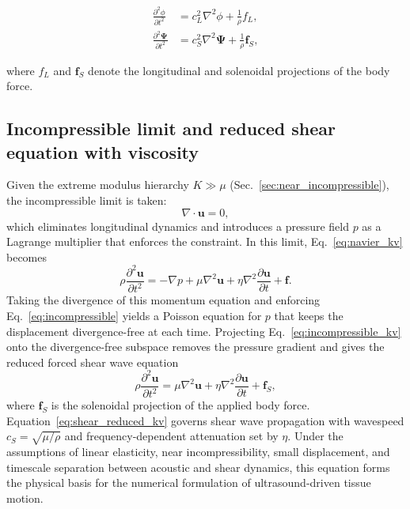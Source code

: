 \documentclass[11pt]{article}
\begin{document}
\begin{align}
\frac{\partial^2 \phi}{\partial t^2} &= c_L^2 \nabla^2 \phi + \frac{1}{\rho} f_L,
\\
\frac{\partial^2 \mathbf{\Psi}}{\partial t^2} &= c_S^2 \nabla^2 \mathbf{\Psi} + \frac{1}{\rho} \mathbf{f}_S,
\end{align}

where $f_L$ and $\mathbf{f}_S$ denote the longitudinal and solenoidal
projections of the body force.

\subsection{Incompressible limit and reduced shear equation with viscosity}
\label{sec:incompressible_limit}

Given the extreme modulus hierarchy $K \gg \mu$ (Sec.~\ref{sec:near_incompressible}),
the incompressible limit is taken:
\begin{equation}
\nabla \cdot \mathbf{u} = 0,
\label{eq:incompressible}
\end{equation}
which eliminates longitudinal dynamics and introduces a pressure field $p$
as a Lagrange multiplier that enforces the constraint. In this limit,
Eq.~\eqref{eq:navier_kv} becomes
\begin{equation}
\rho \frac{\partial^2 \mathbf{u}}{\partial t^2}
=
-\nabla p + \mu \nabla^2 \mathbf{u}
+ \eta \nabla^2 \frac{\partial \mathbf{u}}{\partial t}
+ \mathbf{f}.
\label{eq:incompressible_kv}
\end{equation}
Taking the divergence of this momentum equation and enforcing
Eq.~\eqref{eq:incompressible} yields a Poisson equation for $p$ that
keeps the displacement divergence-free at each time. Projecting
Eq.~\eqref{eq:incompressible_kv} onto the divergence-free subspace removes
the pressure gradient and gives the reduced forced shear wave equation
\begin{equation}
\rho \frac{\partial^2 \mathbf{u}}{\partial t^2}
=
\mu \nabla^2 \mathbf{u}
+ \eta \nabla^2 \frac{\partial \mathbf{u}}{\partial t}
+ \mathbf{f}_S,
\label{eq:shear_reduced_kv}
\end{equation}
where $\mathbf{f}_S$ is the solenoidal projection of the applied body force.
Equation~\eqref{eq:shear_reduced_kv} governs shear wave propagation with
wavespeed $c_S = \sqrt{\mu/\rho}$ and frequency-dependent attenuation set by $\eta$.
Under the assumptions of linear elasticity, near incompressibility, small
displacement, and timescale separation between acoustic and shear dynamics,
this equation forms the physical basis for the numerical formulation of
ultrasound-driven tissue motion.
\end{document}
